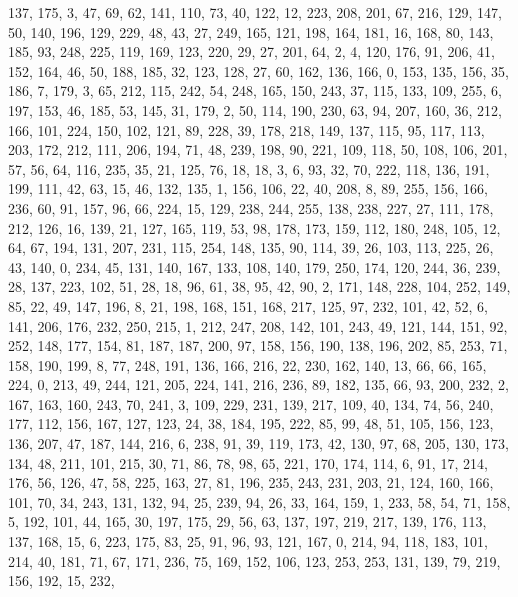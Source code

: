 \begin{DoxyCode}
       137, 175, 3, 47, 69, 62, 141, 110, 73, 40, 122, 12, 223, 208, 201, 67, 216, 129, 147, 50, 140, 196, 129, 229,
       48, 43, 27, 249, 165, 121, 198, 164, 181, 16, 168, 80, 143, 185, 93, 248, 225, 119, 169, 123, 220, 29, 27,
       201, 64, 2, 4, 120, 176, 91, 206, 41, 152, 164, 46, 50, 188, 185, 32, 123, 128, 27, 60, 162, 136, 166, 0, 153,
       135, 156, 35, 186, 7, 179, 3, 65, 212, 115, 242, 54, 248, 165, 150, 243, 37, 115, 133, 109, 255, 6, 197,
       153, 46, 185, 53, 145, 31, 179, 2, 50, 114, 190, 230, 63, 94, 207, 160, 36, 212, 166, 101, 224, 150, 102, 121,
       89, 228, 39, 178, 218, 149, 137, 115, 95, 117, 113, 203, 172, 212, 111, 206, 194, 71, 48, 239, 198, 90,
       221, 109, 118, 50, 108, 106, 201, 57, 56, 64, 116, 235, 35, 21, 125, 76, 18, 18, 3, 6, 93, 32, 70, 222, 118,
       136, 191, 199, 111, 42, 63, 15, 46, 132, 135, 1, 156, 106, 22, 40, 208, 8, 89, 255, 156, 166, 236, 60, 91,
       157, 96, 66, 224, 15, 129, 238, 244, 255, 138, 238, 227, 27, 111, 178, 212, 126, 16, 139, 21, 127, 165, 119,
       53, 98, 178, 173, 159, 112, 180, 248, 105, 12, 64, 67, 194, 131, 207, 231, 115, 254, 148, 135, 90, 114, 39,
       26, 103, 113, 225, 26, 43, 140, 0, 234, 45, 131, 140, 167, 133, 108, 140, 179, 250, 174, 120, 244, 36, 239,
       28, 137, 223, 102, 51, 28, 18, 96, 61, 38, 95, 42, 90, 2, 171, 148, 228, 104, 252, 149, 85, 22, 49, 147, 196,
       8, 21, 198, 168, 151, 168, 217, 125, 97, 232, 101, 42, 52, 6, 141, 206, 176, 232, 250, 215, 1, 212, 247,
       208, 142, 101, 243, 49, 121, 144, 151, 92, 252, 148, 177, 154, 81, 187, 187, 200, 97, 158, 156, 190, 138, 196,
       202, 85, 253, 71, 158, 190, 199, 8, 77, 248, 191, 136, 166, 216, 22, 230, 162, 140, 13, 66, 66, 165, 224, 0,
       213, 49, 244, 121, 205, 224, 141, 216, 236, 89, 182, 135, 66, 93, 200, 232, 2, 167, 163, 160, 243, 70, 241,
       3, 109, 229, 231, 139, 217, 109, 40, 134, 74, 56, 240, 177, 112, 156, 167, 127, 123, 24, 38, 184, 195, 222,
       85, 99, 48, 51, 105, 156, 123, 136, 207, 47, 187, 144, 216, 6, 238, 91, 39, 119, 173, 42, 130, 97, 68, 205,
       130, 173, 134, 48, 211, 101, 215, 30, 71, 86, 78, 98, 65, 221, 170, 174, 114, 6, 91, 17, 214, 176, 56, 126,
       47, 58, 225, 163, 27, 81, 196, 235, 243, 231, 203, 21, 124, 160, 166, 101, 70, 34, 243, 131, 132, 94, 25,
       239, 94, 26, 33, 164, 159, 1, 233, 58, 54, 71, 158, 5, 192, 101, 44, 165, 30, 197, 175, 29, 56, 63, 137, 197,
       219, 217, 139, 176, 113, 137, 168, 15, 6, 223, 175, 83, 25, 91, 96, 93, 121, 167, 0, 214, 94, 118, 183,
       101, 214, 40, 181, 71, 67, 171, 236, 75, 169, 152, 106, 123, 253, 253, 131, 139, 79, 219, 156, 192, 15, 232,

\end{DoxyCode}
